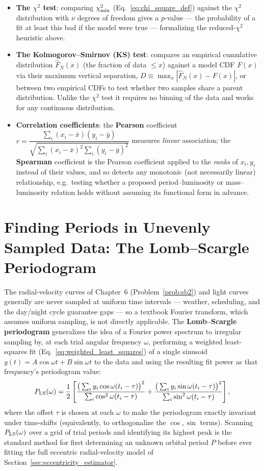 \begin{itemize}
	\item \textbf{The $\chi^2$ test}: comparing $\chi^2_{\rm min}$ (Eq.~\eqref{eq:chi_square_def}) against the $\chi^2$ distribution with $\nu$ degrees of freedom gives a $p$-value --- the probability of a fit at least this bad if the model were true --- formalizing the reduced-$\chi^2$ heuristic above.
	\item \textbf{The Kolmogorov--Smirnov (KS) test}: compares an empirical cumulative distribution $\hat F_N(x)$ (the fraction of data $\le x$) against a model CDF $F(x)$ via their maximum vertical separation, $D\equiv\max_x|\hat F_N(x)-F(x)|$, or between two empirical CDFs to test whether two samples share a parent distribution. Unlike the $\chi^2$ test it requires no binning of the data and works for any continuous distribution.
	\item \textbf{Correlation coefficients}: the \textbf{Pearson} coefficient $r=\dfrac{\sum_i(x_i-\bar x)(y_i-\bar y)}{\sqrt{\sum_i(x_i-\bar x)^2\sum_i(y_i-\bar y)^2}}$ measures \emph{linear} association; the \textbf{Spearman} coefficient is the Pearson coefficient applied to the \emph{ranks} of $x_i,y_i$ instead of their values, and so detects any monotonic (not necessarily linear) relationship, e.g.\ testing whether a proposed period--luminosity or mass--luminosity relation holds without assuming its functional form in advance.
\end{itemize}

\section{Finding Periods in Unevenly Sampled Data: The Lomb--Scargle Periodogram}

The radial-velocity curves of Chapter~6 (Problem~\ref{prob:sb2}) and light curves generally are never sampled at uniform time intervals --- weather, scheduling, and the day/night cycle guarantee gaps --- so a textbook Fourier transform, which assumes uniform sampling, is not directly applicable. The \textbf{Lomb--Scargle periodogram} generalizes the idea of a Fourier power spectrum to irregular sampling by, at each trial angular frequency $\omega$, performing a weighted least-squares fit (Eq.~\eqref{eq:weighted_least_squares}) of a single sinusoid $y(t)=A\cos\omega t+B\sin\omega t$ to the data and using the resulting fit power as that frequency's periodogram value:
\begin{equation}
	P_{\rm LS}(\omega) = \frac{1}{2}\left[\frac{\big(\sum_i y_i\cos\omega(t_i-\tau)\big)^2}{\sum_i\cos^2\omega(t_i-\tau)} + \frac{\big(\sum_i y_i\sin\omega(t_i-\tau)\big)^2}{\sum_i\sin^2\omega(t_i-\tau)}\right],
	\label{eq:lomb_scargle}
\end{equation}
where the offset $\tau$ is chosen at each $\omega$ to make the periodogram exactly invariant under time-shifts (equivalently, to orthogonalize the $\cos,\sin$ terms). Scanning $P_{\rm LS}(\omega)$ over a grid of trial periods and identifying its highest peak is the standard method for first determining an unknown orbital period $P$ before ever fitting the full eccentric radial-velocity model of Section~\ref{sec:eccentricity_estimator}.

